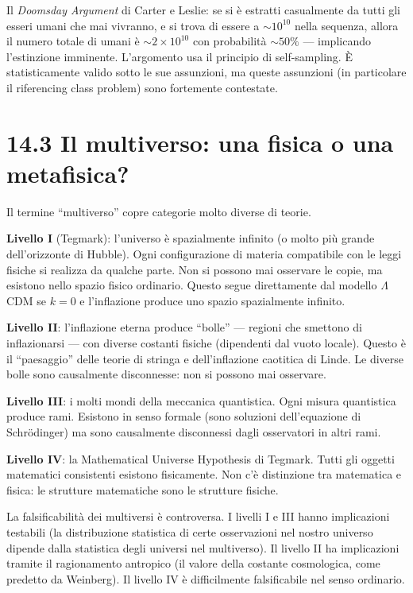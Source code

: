 \documentclass[11.5pt,a4paper,openany]{book}
\theoremstyle{remark}
\begin{document}
Il \textit{Doomsday Argument} di Carter e Leslie: se si è estratti casualmente da tutti gli esseri umani che mai vivranno, e si trova di essere a $\sim 10^{10}$ nella sequenza, allora il numero totale di umani è $\sim 2 \times 10^{10}$ con probabilità $\sim 50\%$ --- implicando l'estinzione imminente. L'argomento usa il principio di self-sampling. È statisticamente valido sotto le sue assunzioni, ma queste assunzioni (in particolare il riferencing class problem) sono fortemente contestate.

\section{14.3 Il multiverso: una fisica o una metafisica?}

Il termine ``multiverso'' copre categorie molto diverse di teorie.

\textbf{Livello I} (Tegmark): l'universo è spazialmente infinito (o molto più grande dell'orizzonte di Hubble). Ogni configurazione di materia compatibile con le leggi fisiche si realizza da qualche parte. Non si possono mai osservare le copie, ma esistono nello spazio fisico ordinario. Questo segue direttamente dal modello $\Lambda$CDM se $k = 0$ e l'inflazione produce uno spazio spazialmente infinito.

\textbf{Livello II}: l'inflazione eterna produce ``bolle'' --- regioni che smettono di inflazionarsi --- con diverse costanti fisiche (dipendenti dal vuoto locale). Questo è il ``paesaggio'' delle teorie di stringa e dell'inflazione caotitica di Linde. Le diverse bolle sono causalmente disconnesse: non si possono mai osservare.

\textbf{Livello III}: i molti mondi della meccanica quantistica. Ogni misura quantistica produce rami. Esistono in senso formale (sono soluzioni dell'equazione di Schrödinger) ma sono causalmente disconnessi dagli osservatori in altri rami.

\textbf{Livello IV}: la Mathematical Universe Hypothesis di Tegmark. Tutti gli oggetti matematici consistenti esistono fisicamente. Non c'è distinzione tra matematica e fisica: le strutture matematiche sono le strutture fisiche.

La falsificabilità dei multiversi è controversa. I livelli I e III hanno implicazioni testabili (la distribuzione statistica di certe osservazioni nel nostro universo dipende dalla statistica degli universi nel multiverso). Il livello II ha implicazioni tramite il ragionamento antropico (il valore della costante cosmologica, come predetto da Weinberg). Il livello IV è difficilmente falsificabile nel senso ordinario.
\end{document}
